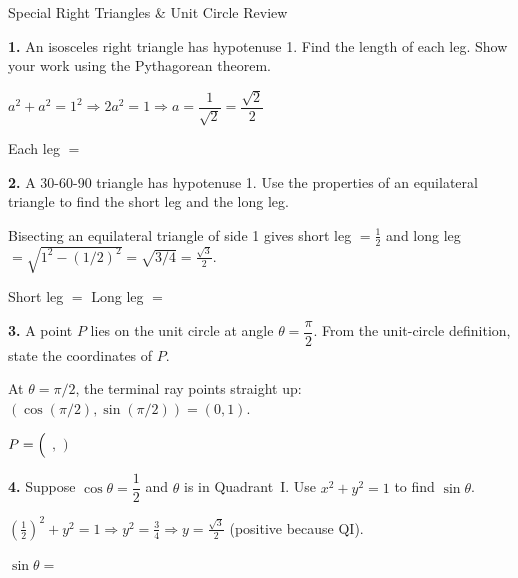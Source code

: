 \documentclass[10pt]{article}
\begin{document}
\namedateperiod

\vspace{0.12in}

\begin{notesbox}{Special Right Triangles \& Unit Circle Review}

\textbf{1.} An isosceles right triangle has hypotenuse 1. Find the length of each leg.
Show your work using the Pythagorean theorem.

\medskip
$a^2 + a^2 = 1^2 \Rightarrow 2a^2 = 1 \Rightarrow a = \dfrac{1}{\sqrt{2}} = \dfrac{\sqrt{2}}{2}$

\vspace{0.1in}

Each leg $= $ 

\vspace{0.18in}

\textbf{2.} A 30-60-90 triangle has hypotenuse 1. Use the properties of an equilateral
triangle to find the short leg and the long leg.

\medskip
Bisecting an equilateral triangle of side 1 gives short leg $= \tfrac{1}{2}$ and
long leg $= \sqrt{1^2 - (1/2)^2} = \sqrt{3/4} = \tfrac{\sqrt{3}}{2}$.

\vspace{0.1in}

Short leg $= $  \qquad Long leg $= $ 

\vspace{0.18in}

\textbf{3.} A point $P$ lies on the unit circle at angle $\theta = \dfrac{\pi}{2}$.
From the unit-circle definition, state the coordinates of $P$.

\medskip
At $\theta = \pi/2$, the terminal ray points straight up: $(\cos(\pi/2), \sin(\pi/2)) = (0, 1)$.

\vspace{0.1in}

$P = \Bigl($  $,$  $\Bigr)$

\vspace{0.18in}

\textbf{4.} Suppose $\cos\theta = \dfrac{1}{2}$ and $\theta$ is in Quadrant~I.
Use $x^2 + y^2 = 1$ to find $\sin\theta$.

\medskip
$\left(\tfrac{1}{2}\right)^2 + y^2 = 1 \Rightarrow y^2 = \tfrac{3}{4} \Rightarrow y = \tfrac{\sqrt{3}}{2}$
(positive because QI).

\vspace{0.1in}

$\sin\theta = $ 

\end{notesbox}
\end{document}
